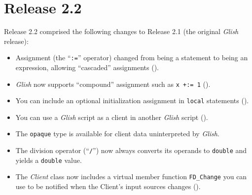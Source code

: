 \section{Release 2.2}

Release 2.2 comprised the following changes to Release 2.1 (the
original \emph{Glish} release):
\begin{itemize}

\item Assignment (the ``\texttt{:=}'' operator) changed from being
a statement to being an expression, allowing ``cascaded'' assignments
().

\item \emph{Glish} now supports ``compound'' assignment such as \texttt{x +:= 1}
().

\item You can include an optional initialization assignment in
\texttt{local} statements ().

\item You can use a \emph{Glish} script as a client in another \emph{Glish} script
().

\item The \texttt{opaque} type is available for client data uninterpreted
by \emph{Glish}.

\item The division operator (``\texttt{/}'') now always converts its
operands to \texttt{double} and yields a \texttt{double} value.

\item The \emph{Client} class now includes a virtual member function
\texttt{FD\_Change} you can use to be notified when the Client's
input sources changes ().

\end{itemize}
